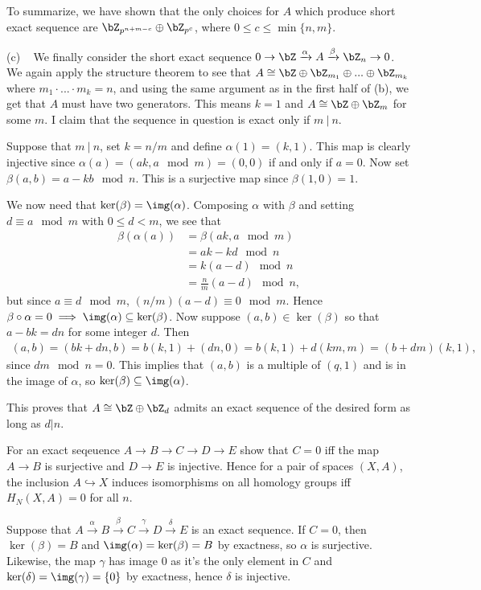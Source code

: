 \begin{homework}[e]
\begin{prf}
    To summarize, we have shown that the only choices for $A$ which produce short exact sequence are $\bZ_{p^{n+m-c}}\oplus \bZ_{p^c}$, where $0 \leq c\leq \min\{n,m\}$.

    \bigskip

    (c) ~ We finally consider the short exact sequence $0 \to \bZ \xrightarrow{\alpha} A \xrightarrow{\beta} \bZ_n \to 0$. We again apply the structure theorem to see that
    $A \cong \bZ \oplus \bZ_{m_1}\oplus ...\oplus \bZ_{m_k}$ where $m_1\cdot...\cdot m_k = n$, and using the same argument as in the first half of (b), we get that $A$ must have two generators. This means $k = 1$ and $A \cong \bZ \oplus \bZ_{m}$ for some $m$. I claim that the sequence in question is exact only if $m ~|~ n$.

    Suppose that $m ~|~ n$, set $k = n/m$ and define $\alpha(1) = (k,1)$. This map is clearly injective since $\alpha(a) = (ak,a \mod m) = (0,0)$ if and only if $a = 0$. Now set $\beta(a,b) = a - kb \mod n$. This is a surjective map since $\beta(1,0) = 1$.

    We now need that $\ker(\beta) = \img(\alpha)$. Composing $\alpha$ with $\beta$ and setting $d \equiv a \mod m$ with $0\leq d < m$, we see that
    \begin{align*}
      \beta(\alpha(a)) &= \beta(ak, a\mod m) \\
                       &= ak - kd \mod n \\
                       &= k(a - d) \mod n\\
                       &= \frac{n}{m}(a - d) \mod n,
    \end{align*}
    but since $a \equiv d \mod m$, $(n/m)(a-d) \equiv 0\mod m$. Hence $\beta\circ \alpha = 0\implies \img(\alpha) \subseteq \ker(\beta)$. Now suppose $(a,b) \in \ker(\beta)$ so that $a - bk = dn$ for some integer $d$. Then
    \begin{align*}
      (a,b) = (bk + dn,b) = b(k, 1) + (dn,0) = b(k,1) + d(km,m) = (b + dm)(k,1),
    \end{align*}
    since $dm \mod n = 0$. This implies that $(a,b)$ is a multiple of $(q,1)$ and is in the image of $\alpha$, so $\ker(\beta)\subseteq \img(\alpha)$.

    This proves that $A \cong \bZ\oplus \bZ_d$ admits an exact sequence of the desired form as long as $d | n$.
  \end{prf}
  \prob[2.1.15] For an exact seqeuence $A\to B\to C\to D\to E$ show that $C = 0$ iff the map $A\to B$ is surjective and $D\to E$ is injective. Hence for a pair of spaces $(X,A)$, the inclusion $A\hookrightarrow X$ induces isomorphisms on all homology groups iff $H_N(X,A) = 0$ for all $n.$
  \begin{prf}
    Suppose that $A\xrightarrow{\alpha} B\xrightarrow{\beta} C\xrightarrow{\gamma} D\xrightarrow{\delta} E$ is an exact sequence. If $C = 0$, then $\ker(\beta) = B$ and $\img(\alpha) = \ker(\beta) = B$ by exactness, so $\alpha$ is surjective. Likewise, the map $\gamma$ has image 0 as it's the only element in $C$ and $\ker(\delta) = \img(\gamma) = \{0\}$ by exactness, hence $\delta$ is injective.


\end{prf}
\end{homework}
